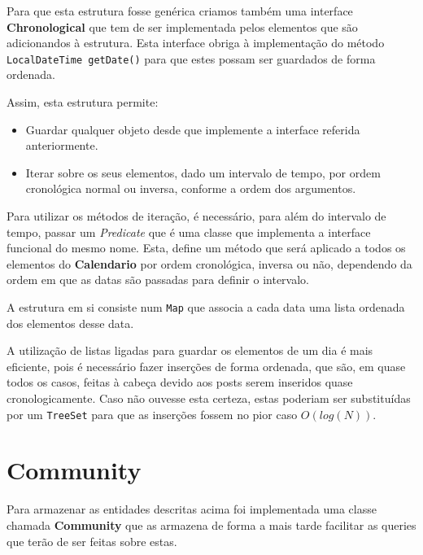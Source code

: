 \documentclass[10pt,a4paper]{report}
\begin{document}
        Para que esta estrutura fosse genérica criamos também uma interface
        \textbf{Chronological} que tem de ser implementada pelos elementos
        que são adicionandos à estrutura. Esta interface obriga à implementação
        do método \texttt{LocalDateTime getDate()} para que estes
        possam ser guardados de forma ordenada.

        Assim, esta estrutura permite:
        \begin{itemize}
                \item Guardar qualquer objeto desde que implemente a interface
                      referida anteriormente.
                \item Iterar sobre os seus elementos, dado um intervalo de
                      tempo, por ordem cronológica normal ou inversa, conforme a
                      ordem dos argumentos.
        \end{itemize}

        Para utilizar os métodos de iteração, é necessário, para além do
        intervalo de tempo, passar um \textit{Predicate} que é uma classe que
        implementa a interface funcional do mesmo nome. Esta, define um método
        que será aplicado a todos os elementos do \textbf{Calendario} por ordem
        cronológica, inversa ou não, dependendo da ordem em que as datas são
        passadas para definir o intervalo.

        A estrutura em si consiste num \texttt{Map} que associa a cada
        data uma lista ordenada dos elementos desse data.

        A utilização de listas ligadas para guardar os elementos de um dia é
        mais eficiente, pois é necessário fazer inserções de forma ordenada,
        que são, em quase todos os casos, feitas à cabeça devido aos posts serem
        inseridos quase cronologicamente. Caso não ouvesse esta certeza, estas
        poderiam ser substituídas por um \texttt{TreeSet} para que
        as inserções fossem no pior caso $O(log(N))$.

    \section{Community}
    Para armazenar as entidades descritas acima foi implementada uma classe
    chamada \textbf{Community} que as armazena de forma a mais tarde facilitar
    as queries que terão de ser feitas sobre estas.
\end{document}
